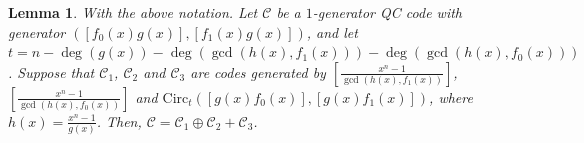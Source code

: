 \documentclass[journal]{IEEEtran}
\newtheorem{lemma}{Lemma}
\begin{document}
\begin{lemma}\label{QCmatrix_spread}
	With the above notation.
	Let $\mathscr{C}$ be a $1$-generator QC code with generator $(\left[f_0(x)g(x)\right],\left[f_1(x)g(x)\right])$, and let $t=n-\deg(g(x))-\deg(\gcd( h(x),f_1(x)))-\deg(\gcd( h(x),f_0(x)))$.
	Suppose that $\mathscr{C}_1$, $\mathscr{C}_2$ and $\mathscr{C}_3$ are codes generated by $\left[\frac{x^n-1}{\gcd( h(x),f_1(x))}\right]$, $\left[ \frac{x^n-1}{\gcd( h(x),f_0(x))}\right]$ and $\mathrm{Circ}_t\left( \left[g(x)f_0(x)\right],\left[g(x)f_1(x)\right] \right)$, where $h(x)=\frac{x^n-1}{g(x)}$. Then,  $\mathscr{C}=\mathscr{C}_1\oplus \mathscr{C}_2 + \mathscr{C}_3$.
\end{lemma}
\end{document}
